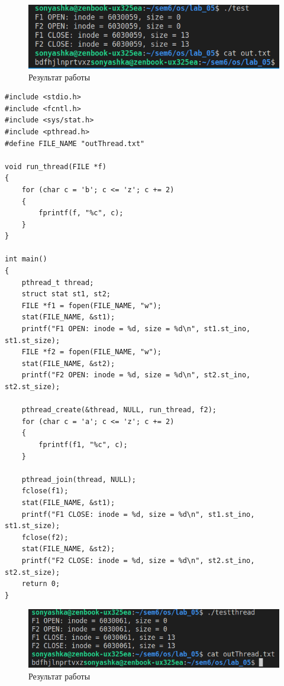 \documentclass[14pt,a4paper]{scrreprt}
\begin{document}
\begin{figure}[H]
	\begin{center}
		\includegraphics[scale=0.7]{assets/test.png}
	\end{center}
	\caption{Результат работы}
\end{figure}
\newpage
\begin{lstlisting}[caption=Программа с дополнительным потоком]
#include <stdio.h>
#include <fcntl.h>
#include <sys/stat.h>
#include <pthread.h>
#define FILE_NAME "outThread.txt"

void run_thread(FILE *f)
{
	for (char c = 'b'; c <= 'z'; c += 2)
	{
		fprintf(f, "%c", c);
	}
}

int main()
{
	pthread_t thread;
	struct stat st1, st2;
	FILE *f1 = fopen(FILE_NAME, "w");
	stat(FILE_NAME, &st1);
	printf("F1 OPEN: inode = %d, size = %d\n", st1.st_ino, st1.st_size);
	FILE *f2 = fopen(FILE_NAME, "w");
	stat(FILE_NAME, &st2);
	printf("F2 OPEN: inode = %d, size = %d\n", st2.st_ino, st2.st_size);
	
	pthread_create(&thread, NULL, run_thread, f2);
	for (char c = 'a'; c <= 'z'; c += 2)
	{
		fprintf(f1, "%c", c);
	}
	
	pthread_join(thread, NULL);
	fclose(f1);
	stat(FILE_NAME, &st1);
	printf("F1 CLOSE: inode = %d, size = %d\n", st1.st_ino, st1.st_size);
	fclose(f2);
	stat(FILE_NAME, &st2);
	printf("F2 CLOSE: inode = %d, size = %d\n", st2.st_ino, st2.st_size);
	return 0;
}
\end{lstlisting}

\begin{figure}[H]
	\begin{center}
		\includegraphics[scale=0.7]{assets/testThread.png}
	\end{center}
	\caption{Результат работы}
\end{figure}
\end{document}
